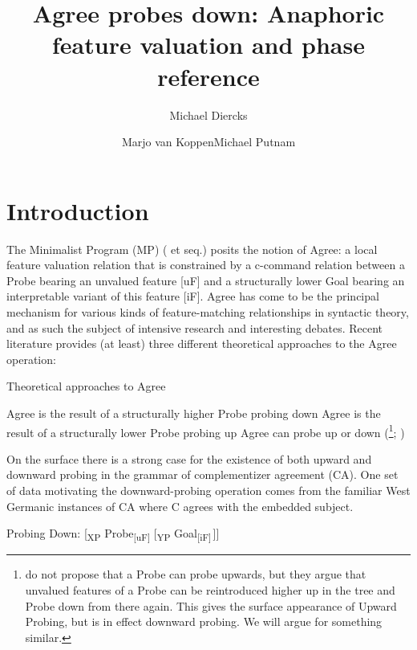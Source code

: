 \documentclass[output=paper
,modfonts
,nonflat
]{langsci/langscibook}
\title{Agree probes down: Anaphoric feature valuation and phase reference}
\author{Michael Diercks\affiliation{Pomona College}\and Marjo van Koppen\affiliation{Utrecht University/Meertens Institute}\lastand Michael Putnam\affiliation{Penn State University}}
\begin{document}
\maketitle

\section{Introduction} \label{Introduction}

The Minimalist Program (MP) (\citealt{Chomsky2000} et seq.) posits the notion of Agree: a local feature valuation relation that is constrained by a c-command relation between a Probe bearing an unvalued feature [uF] and a structurally lower Goal bearing an interpretable variant of this feature [iF]. Agree has come to be the principal mechanism for various kinds of feature-matching relationships in syntactic theory, and as such the subject of intensive research and interesting debates. Recent literature provides (at least) three different theoretical approaches to the Agree operation:

\ea
Theoretical approaches to Agree \label{TheoryApproaches}
\begin{xlist}
\ex Agree is the result of a structurally higher Probe probing down \citep{Chomsky2000,Chomsky:2001,Preminger:2013,Polinsky:2015}
\ex Agree is the result of a structurally lower Probe probing up \citep{Zeijlstra:2012, Wurmbrand:2011, Bjorkman:toappearb} 
\ex Agree can probe up or down (\citealt{Bejar:2009}\footnote{\citet{Bejar:2009} do not propose that a Probe can probe upwards, but they argue that unvalued features of a Probe can be reintroduced higher up in the tree and Probe down from there again. This gives the surface appearance of Upward Probing, but is in effect downward probing. We will argue for something similar.}; \citealt{Baker:2008,Putnam:2011,Carstens:2016})
\end{xlist}
\z
\noindent On the surface there is a strong case for the existence of both upward and downward probing in the grammar of complementizer agreement (CA). One set of data motivating the downward-probing operation comes from the familiar West Germanic instances of CA where C agrees with the embedded subject.\largerpage

\ea \label{ProbeDownSchematic}
Probing Down: [\textsubscript{XP} Probe\textsubscript{[uF]} [\textsubscript{YP} Goal\textsubscript{[iF]}\,]]
\z
\end{document}

